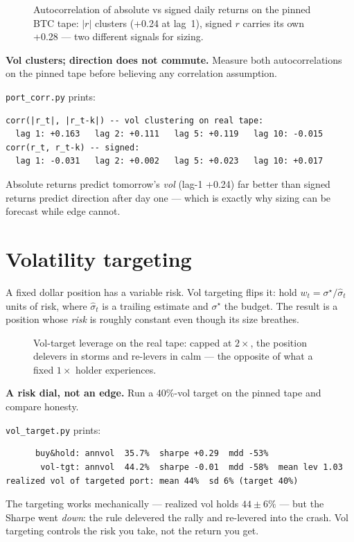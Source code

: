 \begin{figure}[htbp]\centering

\caption{Autocorrelation of absolute vs signed daily returns on
the pinned BTC tape: $|r|$ clusters (+0.24 at lag~1), signed $r$
carries its own +0.28 --- two different signals for sizing.}
\label{fig:autocorr}
\end{figure}

\begin{example}\label{ex:corr16}
\textbf{Vol clusters; direction does not commute.} Measure both
autocorrelations on the pinned tape before believing any
correlation assumption.
\begin{solution}
\texttt{port\_corr.py} prints:
\begin{verbatim}
corr(|r_t|, |r_t-k|) -- vol clustering on real tape:
  lag 1: +0.163   lag 2: +0.111   lag 5: +0.119   lag 10: -0.015
corr(r_t, r_t-k) -- signed:
  lag 1: -0.031   lag 2: +0.002   lag 5: +0.023   lag 10: +0.017
\end{verbatim}
Absolute returns predict tomorrow's \emph{vol} (lag-1 +0.24) far
better than signed returns predict direction after day one ---
which is exactly why sizing can be forecast while edge cannot.
\end{solution}
\end{example}

\section{Volatility targeting}\label{sec:voltgt16}

A fixed dollar position has a variable risk. Vol targeting flips
it: hold $w_t=\sigma^{\star}/\hat\sigma_t$ units of risk, where
$\hat\sigma_t$ is a trailing estimate and $\sigma^{\star}$ the
budget. The result is a position whose \emph{risk} is roughly
constant even though its size breathes.

\begin{figure}[htbp]\centering

\caption{Vol-target leverage on the real tape: capped at $2\times$,
the position delevers in storms and re-levers in calm --- the
opposite of what a fixed $1\times$ holder experiences.}
\label{fig:lev}
\end{figure}

\begin{example}\label{ex:voltgt16}
\textbf{A risk dial, not an edge.} Run a 40\%-vol target on the
pinned tape and compare honesty.
\begin{solution}
\texttt{vol\_target.py} prints:
\begin{verbatim}
      buy&hold: annvol  35.7%  sharpe +0.29  mdd -53%
       vol-tgt: annvol  44.2%  sharpe -0.01  mdd -58%  mean lev 1.03
realized vol of targeted port: mean 44%  sd 6% (target 40%)
\end{verbatim}
The targeting works mechanically --- realized vol holds
$44\pm6\%$ --- but the Sharpe went \emph{down}: the rule delevered
the rally and re-levered into the crash. Vol targeting controls
the risk you take, not the return you get.
\end{solution}
\end{example}

